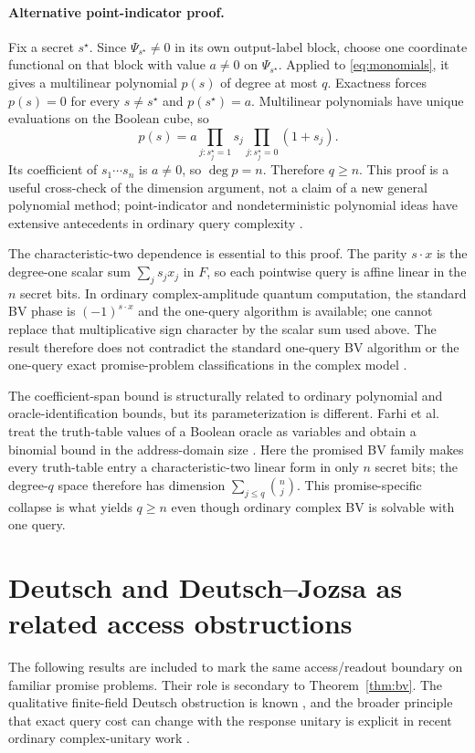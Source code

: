 \documentclass[11pt]{article}
\begin{document}
\paragraph{Alternative point-indicator proof.}
Fix a secret $s^{\star}$. Since $\Psi_{s^{\star}}\ne0$ in its own output-label block, choose one coordinate functional on that block with value $a\ne0$ on $\Psi_{s^{\star}}$. Applied to \eqref{eq:monomials}, it gives a multilinear polynomial $p(s)$ of degree at most $q$. Exactness forces $p(s)=0$ for every $s\ne s^{\star}$ and $p(s^{\star})=a$. Multilinear polynomials have unique evaluations on the Boolean cube, so
\[
 p(s)=a\prod_{j:s^{\star}_j=1}s_j
       \prod_{j:s^{\star}_j=0}(1+s_j).
\]
Its coefficient of $s_1\cdots s_n$ is $a\ne0$, so $\deg p=n$. Therefore $q\ge n$. This proof is a useful cross-check of the dimension argument, not a claim of a new general polynomial method; point-indicator and nondeterministic polynomial ideas have extensive antecedents in ordinary query complexity \cite{Beals2001,deWolf2003}.

The characteristic-two dependence is essential to this proof. The parity $s\cdot x$ is the degree-one scalar sum $\sum_js_jx_j$ in $F$, so each pointwise query is affine linear in the $n$ secret bits. In ordinary complex-amplitude quantum computation, the standard BV phase is $(-1)^{s\cdot x}$ and the one-query algorithm is available; one cannot replace that multiplicative sign character by the scalar sum used above. The result therefore does not contradict the standard one-query BV algorithm or the one-query exact promise-problem classifications in the complex model \cite{Combarro2021}.

The coefficient-span bound is structurally related to ordinary polynomial and oracle-identification bounds, but its parameterization is different. Farhi et al. treat the truth-table values of a Boolean oracle as variables and obtain a binomial bound in the address-domain size \cite{Farhi1999}. Here the promised BV family makes every truth-table entry a characteristic-two linear form in only $n$ secret bits; the degree-$q$ space therefore has dimension $\sum_{j\le q}\binom nj$. This promise-specific collapse is what yields $q\ge n$ even though ordinary complex BV is solvable with one query.

\section{Deutsch and Deutsch--Jozsa as related access obstructions}\label{sec:dj}
The following results are included to mark the same access/readout boundary on familiar promise problems. Their role is secondary to Theorem~\ref{thm:bv}. The qualitative finite-field Deutsch obstruction is known \cite{James2011}, and the broader principle that exact query cost can change with the response unitary is explicit in recent ordinary complex-unitary work \cite{Svozil2026}.
\end{document}
